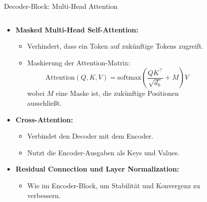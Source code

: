 \documentclass[aspectratio=1610, xcolor=dvipsnames, 9pt]{beamer}
\begin{document}
\begin{frame}{Decoder-Block: Multi-Head Attention}
  \begin{columns}
    \begin{column}{0.7\textwidth}
      \begin{itemize}
        \item \textbf{Masked Multi-Head Self-Attention:}
          \begin{itemize}
            \item Verhindert, dass ein Token auf zukünftige Tokens zugreift.
            \item Maskierung der Attention-Matrix:
              \[
              \text{Attention}(Q, K, V) = \text{softmax}\left(\frac{QK^\top}{\sqrt{d_k}} + M\right)V
              \]
              wobei \( M \) eine Maske ist, die zukünftige Positionen ausschließt.
          \end{itemize}
        \item \textbf{Cross-Attention:}
          \begin{itemize}
            \item Verbindet den Decoder mit dem Encoder.
            \item Nutzt die Encoder-Ausgaben als Keys und Values.
          \end{itemize}
        \item \textbf{Residual Connection und Layer Normalization:}
          \begin{itemize}
            \item Wie im Encoder-Block, um Stabilität und Konvergenz zu verbessern.
          \end{itemize}
      \end{itemize}
    \end{column}
    \begin{column}{0.3\textwidth}
      \begin{figure}
        \centering

\end{figure}
\end{column}
\end{columns}
\end{frame}
\end{document}
